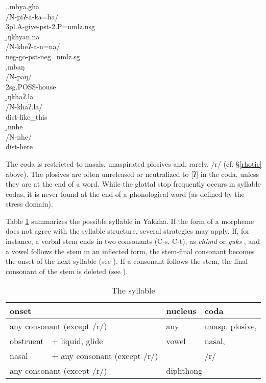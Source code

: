 \ex.\a.\glll	mbya.gha\\
			/N-piʔ-a-ka=ha/\\
			{\sc 3pl.A-}give{\sc -pst-2.P=nmlz.nsg}\\
			\b.\glll ŋkhyan.na\\
			/N-kheʔ-a-n=na/\\
			{\sc neg-}go{\sc [3sg]-pst-neg=nmlz.sg}\\
			\b.\glll	mbaŋ\\
			/N-paŋ/\\
			{\sc 2sg.POSS-}house\\
			\b.\glll ŋkhaʔ.la\\
			/N-khaʔ.la/\\
			{\sc dist-}like\_this\\
			\b.\glll  nnhe\\
			/N-nhe/\\
			{\sc dist-}here\\



The coda is restricted to nasals, unaspirated plosives  and, rarely, /r/ (cf. §\ref{rhotic} above). The plosives are often unreleased or neutralized to [ʔ] in the coda, unless they are at the end of a word. While the glottal stop frequently occurs in syllable codas, it  is never found at the end of a phonological word (as defined by the stress domain).  


Table \ref{syll} summarizes the possible syllable in Yakkha. If the form of a morpheme does not agree with the syllable structure, several strategies may apply. If, for instance, a verbal stem ends in two consonants (C-s, C-t), as \emph{chimd}  or \emph{yuks} , and a vowel follows the stem in an inflected form, the stem-final consonant becomes the onset of the next syllable (see \Next). If a consonant follows the stem, the final consonant of the stem is deleted (see \NNext). 

 \begin{table}[htp]	
 \begin{center}		
\begin{tabular}{ll|l|l}
\hline
\multicolumn{2}{l|}{{\sc onset}}&{\sc nucleus}&{\sc coda}\\
\hline
\multicolumn{2}{l|}{any consonant (except /r/)}&any& unasp. plosive,\\
\cline{1-2}
obstruent&+ liquid, glide&vowel&nasal,\\
\cline{1-2}
nasal&+ any consonant (except /r/)& & /r/\\
\hline
\multicolumn{2}{l|}{any consonant (except /r/)}&\multicolumn{2}{l}{diphthong}\\
\hline
\end{tabular}
\caption{The syllable}\label{syll}
\end{center}
\end{table}



